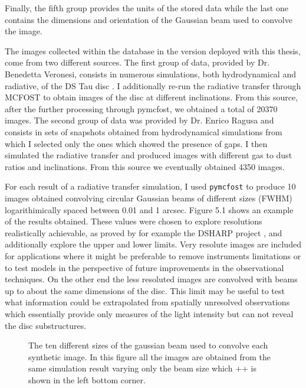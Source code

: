 \documentclass[a4paper,10pt]{report}
\begin{document}
Finally, the fifth group provides the units of the stored data while the last one contains
the dimensions and orientation of the Gaussian beam used to convolve the image.

The images collected within the database in the version deployed with this thesis, come from two different sources.
The first group of data, provided by Dr. Benedetta Veronesi, consists in numerous simulations,
both hydrodynamical and radiative,
of the DS Tau disc \cite{dstauv}. 
I additionally re-run the radiative transfer through MCFOST to obtain images of the disc at different inclinations.
From this source, after the further processing through pymcfost, we obtained a total of 20370 images.
The second group of data was provided by Dr. Enrico Ragusa and consists in sets of snapshots
obtained from hydrodynamical simulations from which I selected only the ones which showed the presence of gaps.
I then simulated the radiative transfer and produced images with different gas to dust ratios and inclinations.
From this source we eventually obtained 4350 images.

For each result of a radiative transfer simulation, I used \lstinline{pymcfost} to produce 10 images obtained convolving circular 
Gaussian beams of different sizes (FWHM)
logarithimically spaced between 0.01 and 1 arcsec. Figure 5.1 shows an example of the results obtained.
These values were chosen to explore resolutions
realistically achievable, as proved by for example the DSHARP project \cite{dsharp}, and additionally explore the upper and lower limits.
Very resolute images are included for applications where it might be preferable to remove instruments limitations
or to test models in the perspective of future improvements in the observational techniques. 
On the other end the less resoluted images are convolved with beams up to about the same dimensions of the disc. 
This limit may be useful to test what information could be extrapolated from spatially unresolved observations
which essentially provide only measures of the light intensity but can not reveal the disc substructures.

\begin{figure}
    \begin{center}
        \scalebox{0.4}{}
    \end{center}
    \caption{The ten different sizes of the gaussian beam used to convolve each synthetic image. 
    In this figure all the images are obtained from the same simulation result varying only the
    beam size which ++
    is shown in the left bottom corner.}
\end{figure}
\end{document}
